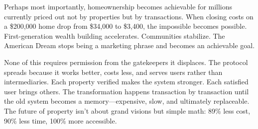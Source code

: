 Perhaps most importantly, homeownership becomes achievable for millions currently priced out not by properties but by transactions. When closing costs on a \$200,000 home drop from \$34,000 to \$3,400, the impossible becomes possible. First-generation wealth building accelerates. Communities stabilize. The American Dream stops being a marketing phrase and becomes an achievable goal.

None of this requires permission from the gatekeepers it displaces. The protocol spreads because it works better, costs less, and serves users rather than intermediaries. Each property verified makes the system stronger. Each satisfied user brings others. The transformation happens transaction by transaction until the old system becomes a memory—expensive, slow, and ultimately replaceable. The future of property isn't about grand visions but simple math: 89\% less cost, 90\% less time, 100\% more accessible.